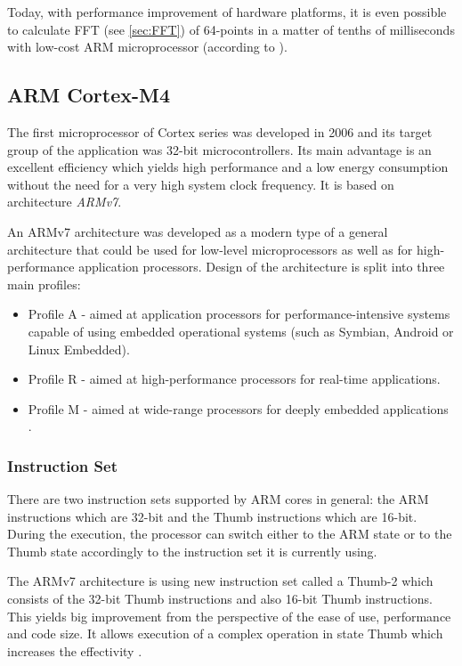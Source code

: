 \documentclass[twoside]{ctuthesis}
\theoremstyle{plain}
\theoremstyle{definition}
\theoremstyle{note}
\begin{document}
Today, with performance improvement of hardware platforms, it is even possible to calculate FFT (see \ref{sec:FFT}) of 64-points in a matter of tenths of milliseconds with low-cost ARM microprocessor (according to \cite{cite:STM32_DSP_library}).
\subsection{ARM Cortex-M4}
\label{sec:ARM_M3}
The first microprocessor of Cortex series was developed in 2006 and its target group of the application was 32-bit microcontrollers. Its main advantage is an excellent efficiency which yields high performance and a low energy consumption without the need for a very high system clock frequency. It is based on architecture \textit{ARMv7}.

An ARMv7 architecture was developed as a modern type of a general architecture that could be used for low-level microprocessors as well as for high-performance application processors. Design of the architecture is split into three main profiles:
\begin{itemize}
	\setlength{\itemsep}{5pt}
	\item Profile A - aimed at application processors for performance-intensive systems capable of using embedded operational systems (such as Symbian, Android or Linux Embedded).
	\item Profile R - aimed at high-performance processors for real-time applications.
	\item Profile M - aimed at wide-range processors for deeply embedded applications \cite{cite:ARM-M3}.
\end{itemize}

\subsubsection{Instruction Set}
There are two instruction sets supported by ARM cores in general: the ARM instructions which are 32-bit and the Thumb instructions which are 16-bit. During the execution, the processor can switch either to the ARM state or to the Thumb state accordingly to the instruction set it is currently using.

The ARMv7 architecture is using new instruction set called a Thumb-2 which consists of the 32-bit Thumb instructions and also 16-bit Thumb instructions. This yields big improvement from the perspective of the ease of use, performance and code size. It allows execution of a complex operation in state Thumb which increases the effectivity \cite{cite:ARM-M3}.
\end{document}
